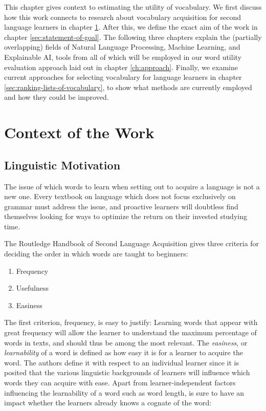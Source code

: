 This chapter gives context to estimating the utility of vocabulary.
We first discuss how this work connects to research about vocabulary acquisition for second language learners in chapter \ref{sec:context-of-work}.
After this, we define the exact aim of the work in chapter \ref{sec:statement-of-goal}.
The following three chapters explain the (partially overlapping) fields of Natural Language Processing, Machine Learning, and Explainable AI, tools from all of which will be employed in our word utility evaluation approach laid out in chapter \ref{ch:approach}.
Finally, we examine current approaches for selecting vocabulary for language learners in chapter \ref{sec:ranking-lists-of-vocabulary}, to show what methods are currently employed and how they could be improved.


\section{Context of the Work} \label{sec:context-of-work}

\subsection{Linguistic Motivation} \label{sec:linguistic-motivation}
The issue of which words to learn when setting out to acquire a language is not a new one.
Every textbook on language which does not focus exclusively on grammar must address the issue, and proactive learners will doubtless find themselves looking for ways to optimize the return on their invested studying time.

The Routledge Handbook of Second Language Acquisition \cite{liRoutledgeHandbookSecond2022} gives three criteria for deciding the order in which words are taught to beginners:

\begin{enumerate}
	\item Frequency
	\item Usefulness
	\item Easiness
\end{enumerate}

The first criterion, frequency, is easy to justify:
Learning words that appear with great frequency will allow the learner to understand the maximum percentage of words in texts, and should thus be among the most relevant.
The \textit{easiness}, or \textit{learnability} of a word is defined as how easy it is for a learner to acquire the word.
The authors define it with respect to an individual learner since it is posited that the various linguistic backgrounds of learners will influence which words they can acquire with ease.
Apart from learner-independent factors influencing the learnability of a word such as word length, is sure to have an impact whether the learners already knows a cognate of the word:


